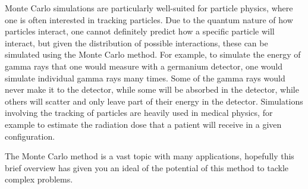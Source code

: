Monte Carlo simulations are particularly well-suited for particle physics, where one is often interested in tracking particles. Due to the quantum nature of how particles interact, one cannot definitely predict how a specific particle will interact, but given the distribution of possible interactions, these can be simulated using the Monte Carlo method. For example, to simulate the energy of gamma rays that one would measure with a germanium detector, one would simulate individual gamma rays many times. Some of the gamma rays would never make it to the detector, while some will be absorbed in the detector, while others will scatter and only leave part of their energy in the detector. Simulations involving the tracking of particles are heavily used in medical physics, for example to estimate the radiation dose that a patient will receive in a given configuration.

The Monte Carlo method is a vast topic with many applications, hopefully this brief overview has given you an ideal of the potential of this method to tackle complex problems.

